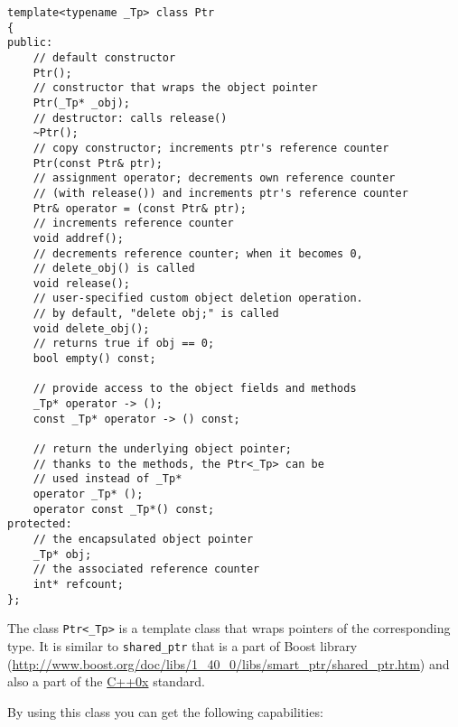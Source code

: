\begin{lstlisting}
template<typename _Tp> class Ptr
{
public:
    // default constructor
    Ptr();
    // constructor that wraps the object pointer
    Ptr(_Tp* _obj);
    // destructor: calls release()
    ~Ptr();
    // copy constructor; increments ptr's reference counter
    Ptr(const Ptr& ptr);
    // assignment operator; decrements own reference counter
    // (with release()) and increments ptr's reference counter 
    Ptr& operator = (const Ptr& ptr);
    // increments reference counter
    void addref();
    // decrements reference counter; when it becomes 0,
    // delete_obj() is called
    void release();
    // user-specified custom object deletion operation.
    // by default, "delete obj;" is called
    void delete_obj();
    // returns true if obj == 0;
    bool empty() const;

    // provide access to the object fields and methods
    _Tp* operator -> ();
    const _Tp* operator -> () const;

    // return the underlying object pointer;
    // thanks to the methods, the Ptr<_Tp> can be
    // used instead of _Tp*
    operator _Tp* ();
    operator const _Tp*() const;
protected:
    // the encapsulated object pointer
    _Tp* obj;
    // the associated reference counter
    int* refcount;
};
\end{lstlisting}

The class \texttt{Ptr<\_Tp>} is a template class that wraps pointers of the corresponding type. It is similar to \texttt{shared\_ptr} that is a part of Boost library (\url{http://www.boost.org/doc/libs/1_40_0/libs/smart_ptr/shared_ptr.htm}) and also a part of the
\href{http://en.wikipedia.org/wiki/C++0x}{C++0x} standard. 

By using this class you can get the following capabilities:

